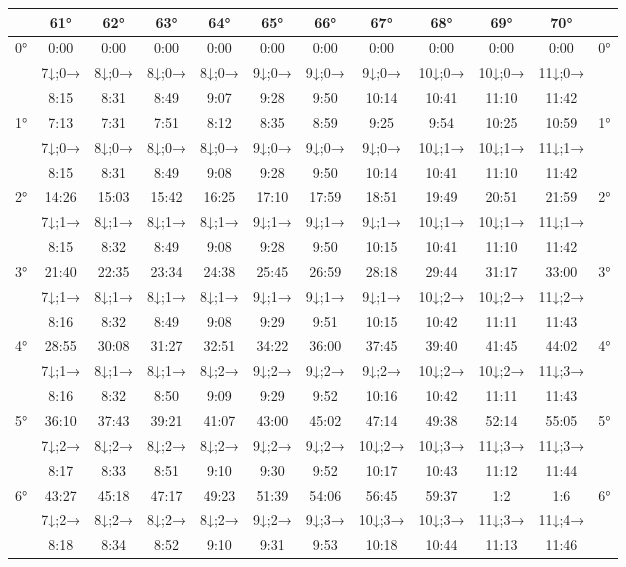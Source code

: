 \begin{scriptsize}\begin{tabular}{c || c | c | c | c | c | c | c | c | c | c || c}
		\space &61°&62°&63°&64°&65°&66°&67°&68°&69°&70°\\\hline\hline
		\multirow{3}{*}{0°}&0:00&0:00&0:00&0:00&0:00&0:00&0:00&0:00&0:00&0:00&\multirow{3}{*}{0°}\\ \space&7↓;0→&8↓;0→&8↓;0→&8↓;0→&9↓;0→&9↓;0→&9↓;0→&10↓;0→&10↓;0→&11↓;0→&\space\\&8:15&8:31&8:49&9:07&9:28&9:50&10:14&10:41&11:10&11:42&\space\\\hline
		\multirow{3}{*}{1°}&7:13&7:31&7:51&8:12&8:35&8:59&9:25&9:54&10:25&10:59&\multirow{3}{*}{1°}\\ \space&7↓;0→&8↓;0→&8↓;0→&8↓;0→&9↓;0→&9↓;0→&9↓;0→&10↓;1→&10↓;1→&11↓;1→&\space\\&8:15&8:31&8:49&9:08&9:28&9:50&10:14&10:41&11:10&11:42&\space\\\hline
		\multirow{3}{*}{2°}&14:26&15:03&15:42&16:25&17:10&17:59&18:51&19:49&20:51&21:59&\multirow{3}{*}{2°}\\ \space&7↓;1→&8↓;1→&8↓;1→&8↓;1→&9↓;1→&9↓;1→&9↓;1→&10↓;1→&10↓;1→&11↓;1→&\space\\&8:15&8:32&8:49&9:08&9:28&9:50&10:15&10:41&11:10&11:42&\space\\\hline
		\multirow{3}{*}{3°}&21:40&22:35&23:34&24:38&25:45&26:59&28:18&29:44&31:17&33:00&\multirow{3}{*}{3°}\\ \space&7↓;1→&8↓;1→&8↓;1→&8↓;1→&9↓;1→&9↓;1→&9↓;1→&10↓;2→&10↓;2→&11↓;2→&\space\\&8:16&8:32&8:49&9:08&9:29&9:51&10:15&10:42&11:11&11:43&\space\\\hline
		\multirow{3}{*}{4°}&28:55&30:08&31:27&32:51&34:22&36:00&37:45&39:40&41:45&44:02&\multirow{3}{*}{4°}\\ \space&7↓;1→&8↓;1→&8↓;1→&8↓;2→&9↓;2→&9↓;2→&9↓;2→&10↓;2→&10↓;2→&11↓;3→&\space\\&8:16&8:32&8:50&9:09&9:29&9:52&10:16&10:42&11:11&11:43&\space\\\hline
		\multirow{3}{*}{5°}&36:10&37:43&39:21&41:07&43:00&45:02&47:14&49:38&52:14&55:05&\multirow{3}{*}{5°}\\ \space&7↓;2→&8↓;2→&8↓;2→&8↓;2→&9↓;2→&9↓;2→&10↓;2→&10↓;3→&11↓;3→&11↓;3→&\space\\&8:17&8:33&8:51&9:10&9:30&9:52&10:17&10:43&11:12&11:44&\space\\\hline
		\multirow{3}{*}{6°}&43:27&45:18&47:17&49:23&51:39&54:06&56:45&59:37&1:2&1:6&\multirow{3}{*}{6°}\\ \space&7↓;2→&8↓;2→&8↓;2→&8↓;2→&9↓;2→&9↓;3→&10↓;3→&10↓;3→&11↓;3→&11↓;4→&\space\\&8:18&8:34&8:52&9:10&9:31&9:53&10:18&10:44&11:13&11:46&\space\\\hline

\end{tabular}
\end{scriptsize}
